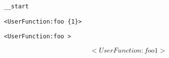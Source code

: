 \documentclass{article}
\begin{document}


\verb|__start|

\verb|<UserFunction:foo {1}>|


\texttt{<UserFunction:foo 
\textbraceright >}

$$<UserFunction:foo {
1
}>$$
\end{document}
